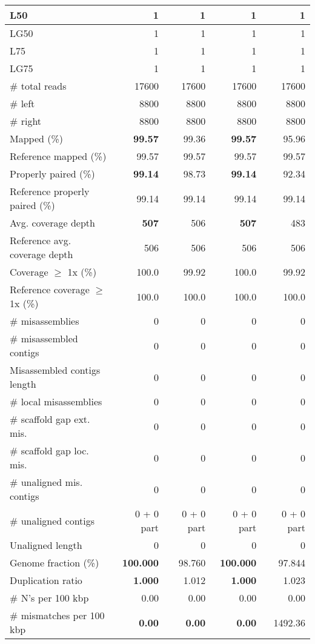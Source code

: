 \documentclass[12pt,a4paper]{article}
\begin{document}
\begin{table}[ht]
\begin{center}
\begin{tabular}{|l*{4}{|r}|}
L50 & 1 & 1 & 1 & 1 \\ \hline
LG50 & 1 & 1 & 1 & 1 \\ \hline
L75 & 1 & 1 & 1 & 1 \\ \hline
LG75 & 1 & 1 & 1 & 1 \\ \hline
\# total reads & 17600 & 17600 & 17600 & 17600 \\ \hline
\# left & 8800 & 8800 & 8800 & 8800 \\ \hline
\# right & 8800 & 8800 & 8800 & 8800 \\ \hline
Mapped (\%) & {\bf 99.57} & 99.36 & {\bf 99.57} & 95.96 \\ \hline
Reference mapped (\%) & 99.57 & 99.57 & 99.57 & 99.57 \\ \hline
Properly paired (\%) & {\bf 99.14} & 98.73 & {\bf 99.14} & 92.34 \\ \hline
Reference properly paired (\%) & 99.14 & 99.14 & 99.14 & 99.14 \\ \hline
Avg. coverage depth & {\bf 507} & 506 & {\bf 507} & 483 \\ \hline
Reference avg. coverage depth & 506 & 506 & 506 & 506 \\ \hline
Coverage $\geq$ 1x (\%) & 100.0 & 99.92 & 100.0 & 99.92 \\ \hline
Reference coverage $\geq$ 1x (\%) & 100.0 & 100.0 & 100.0 & 100.0 \\ \hline
\# misassemblies & 0 & 0 & 0 & 0 \\ \hline
\# misassembled contigs & 0 & 0 & 0 & 0 \\ \hline
Misassembled contigs length & 0 & 0 & 0 & 0 \\ \hline
\# local misassemblies & 0 & 0 & 0 & 0 \\ \hline
\# scaffold gap ext. mis. & 0 & 0 & 0 & 0 \\ \hline
\# scaffold gap loc. mis. & 0 & 0 & 0 & 0 \\ \hline
\# unaligned mis. contigs & 0 & 0 & 0 & 0 \\ \hline
\# unaligned contigs & 0 + 0 part & 0 + 0 part & 0 + 0 part & 0 + 0 part \\ \hline
Unaligned length & 0 & 0 & 0 & 0 \\ \hline
Genome fraction (\%) & {\bf 100.000} & 98.760 & {\bf 100.000} & 97.844 \\ \hline
Duplication ratio & {\bf 1.000} & 1.012 & {\bf 1.000} & 1.023 \\ \hline
\# N's per 100 kbp & 0.00 & 0.00 & 0.00 & 0.00 \\ \hline
\# mismatches per 100 kbp & {\bf 0.00} & {\bf 0.00} & {\bf 0.00} & 1492.36 \\ \hline

\end{tabular}
\end{center}
\end{table}
\end{document}

